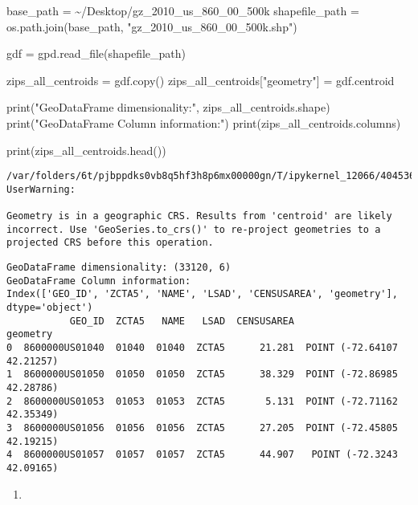 \documentclass[
  letterpaper,
  DIV=11,
  numbers=noendperiod]{scrartcl}
\newenvironment{Shaded}{\begin{snugshade}}{\end{snugshade}}
\newcommand{\BuiltInTok}[1]{\textcolor[rgb]{0.00,0.23,0.31}{#1}}
\newcommand{\NormalTok}[1]{\textcolor[rgb]{0.00,0.23,0.31}{#1}}
\newcommand{\OperatorTok}[1]{\textcolor[rgb]{0.37,0.37,0.37}{#1}}
\newcommand{\StringTok}[1]{\textcolor[rgb]{0.13,0.47,0.30}{#1}}
\providecommand{\tightlist}{%
  \setlength{\itemsep}{0pt}\setlength{\parskip}{0pt}}\usepackage{longtable,booktabs,array}
\begin{document}
\begin{Shaded}
\begin{Highlighting}[]
\NormalTok{base\_path }\OperatorTok{=} \StringTok{\textquotesingle{}\textasciitilde{}/Desktop/gz\_2010\_us\_860\_00\_500k\textquotesingle{}}
\NormalTok{shapefile\_path }\OperatorTok{=}\NormalTok{ os.path.join(base\_path, }\StringTok{"gz\_2010\_us\_860\_00\_500k.shp"}\NormalTok{)}

\NormalTok{gdf }\OperatorTok{=}\NormalTok{ gpd.read\_file(shapefile\_path)}

\NormalTok{zips\_all\_centroids }\OperatorTok{=}\NormalTok{ gdf.copy()}
\NormalTok{zips\_all\_centroids[}\StringTok{"geometry"}\NormalTok{] }\OperatorTok{=}\NormalTok{ gdf.centroid}

\BuiltInTok{print}\NormalTok{(}\StringTok{"GeoDataFrame dimensionality:"}\NormalTok{, zips\_all\_centroids.shape)}
\BuiltInTok{print}\NormalTok{(}\StringTok{"GeoDataFrame Column information:"}\NormalTok{)}
\BuiltInTok{print}\NormalTok{(zips\_all\_centroids.columns)}

\BuiltInTok{print}\NormalTok{(zips\_all\_centroids.head())}
\end{Highlighting}
\end{Shaded}

\begin{verbatim}
/var/folders/6t/pjbppdks0vb8q5hf3h8p6mx00000gn/T/ipykernel_12066/4045363704.py:7: UserWarning:

Geometry is in a geographic CRS. Results from 'centroid' are likely incorrect. Use 'GeoSeries.to_crs()' to re-project geometries to a projected CRS before this operation.

\end{verbatim}

\begin{verbatim}
GeoDataFrame dimensionality: (33120, 6)
GeoDataFrame Column information:
Index(['GEO_ID', 'ZCTA5', 'NAME', 'LSAD', 'CENSUSAREA', 'geometry'], dtype='object')
           GEO_ID  ZCTA5   NAME   LSAD  CENSUSAREA                    geometry
0  8600000US01040  01040  01040  ZCTA5      21.281  POINT (-72.64107 42.21257)
1  8600000US01050  01050  01050  ZCTA5      38.329  POINT (-72.86985 42.28786)
2  8600000US01053  01053  01053  ZCTA5       5.131  POINT (-72.71162 42.35349)
3  8600000US01056  01056  01056  ZCTA5      27.205  POINT (-72.45805 42.19215)
4  8600000US01057  01057  01057  ZCTA5      44.907   POINT (-72.3243 42.09165)
\end{verbatim}

\begin{enumerate}
\def\labelenumi{\arabic{enumi}.}
\setcounter{enumi}{1}
\tightlist
\item
\end{enumerate}
\end{document}
